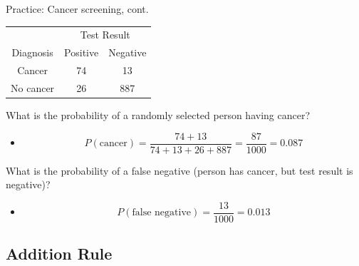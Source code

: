 \documentclass[xcolor=table, handout]{beamer}
\begin{document}
\begin{frame}{Practice: Cancer screening, cont.}
\begin{block}{}
{\centering
\begin{tabular}{c | c  c }
\multicolumn{1}{c}{} & \multicolumn{2}{c}{Test Result}\\
Diagnosis & Positive & Negative \\
\hline
Cancer & 74 & 13 \\
No cancer & 26 & 887\\
\end{tabular}\par
}
\end{block}

\begin{exampleblock}{}
What is the probability of a randomly selected person having cancer?
\begin{itemize}
\pause
\item \[P(\text{cancer}) = \frac {74 + 13}{74+13+26+887} = \frac {87}{1000} = 0.087\]
\end{itemize}

\pause
What is the probability of a false negative (person has cancer, but test result is negative)?
\begin{itemize}
\pause
\item \[ P(\text{false negative}) = \frac {13}{1000} = 0.013\]
\end{itemize}
\end{exampleblock}
\end{frame}

\subsection{Addition Rule}
\end{document}
